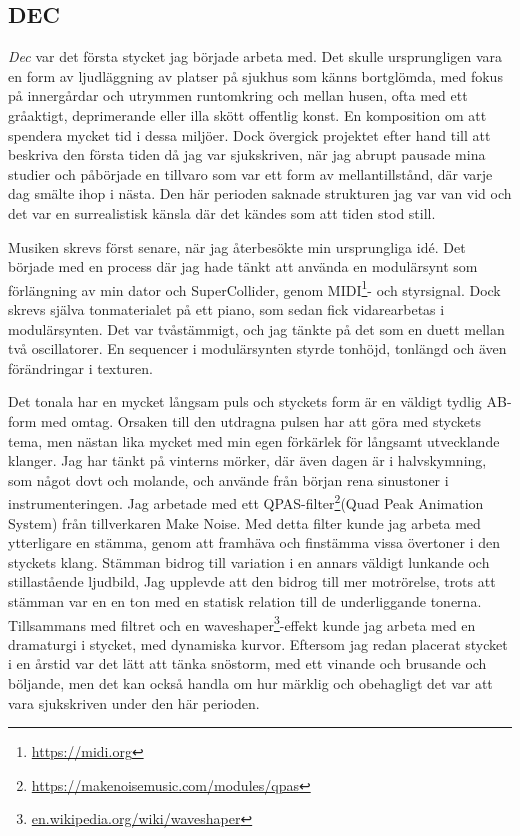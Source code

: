 \documentclass{article}
\begin{document}


\subsection{DEC}
\emph{Dec} var det första stycket jag började arbeta med. Det skulle ursprungligen vara en form av ljudläggning
av platser på sjukhus som känns bortglömda, med fokus på innergårdar och utrymmen runtomkring och mellan
husen, ofta med ett gråaktigt, deprimerande eller illa skött offentlig konst. En komposition om att spendera
mycket tid i dessa miljöer. Dock övergick projektet efter hand till att beskriva den första tiden då jag var
sjukskriven, när jag abrupt pausade mina studier och påbörjade en tillvaro som var ett form av
mellantillstånd, där varje dag smälte ihop i nästa. Den här perioden saknade strukturen jag var van vid och
det var en surrealistisk känsla där det kändes som att tiden stod still.

Musiken skrevs först senare, när jag återbesökte min ursprungliga idé. Det började med en process där jag hade
tänkt att använda en modulärsynt som förlängning av min dator och SuperCollider, genom
MIDI\footnote{\url{https://midi.org}}- och styrsignal. 
Dock skrevs själva tonmaterialet på ett piano, som sedan fick vidarearbetas i modulärsynten. Det var
tvåstämmigt, och jag tänkte på det som en duett mellan två oscillatorer. En sequencer i modulärsynten styrde 
tonhöjd, tonlängd och även förändringar i texturen. 

Det tonala har en mycket långsam puls och styckets form är en väldigt tydlig AB-form med omtag. Orsaken till
den utdragna pulsen har att göra med styckets tema, men nästan lika mycket med min egen förkärlek för långsamt
utvecklande klanger. Jag har tänkt på vinterns mörker, där även dagen är i halvskymning, som något dovt och
molande, och använde från början rena sinustoner i instrumenteringen. Jag arbetade med ett
QPAS-filter\footnote{\url{https://makenoisemusic.com/modules/qpas}}(Quad Peak Animation System) från
tillverkaren Make Noise. Med detta filter kunde jag arbeta med ytterligare en stämma, genom att framhäva och
finstämma vissa övertoner i den styckets klang. Stämman bidrog till variation i en annars väldigt lunkande och
stillastående ljudbild, Jag upplevde att den bidrog till mer motrörelse, trots att stämman var en en ton med
en statisk relation till de underliggande tonerna. Tillsammans med filtret och en
waveshaper\footnote{\url{en.wikipedia.org/wiki/waveshaper}}-effekt kunde jag arbeta med en dramaturgi i
stycket, med dynamiska kurvor. Eftersom jag redan placerat stycket i en årstid var det lätt att tänka
snöstorm, med ett vinande och brusande och böljande, men det kan också handla om hur märklig och obehagligt
det var att vara sjukskriven under den här perioden.
\end{document}
